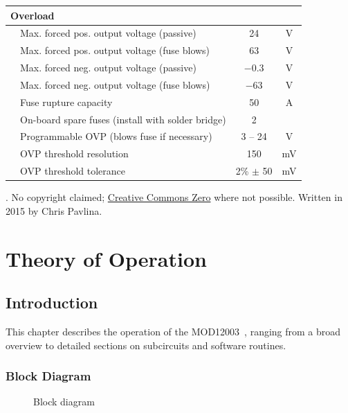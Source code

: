 \documentclass[a4paper,twocolumn,10pt,openany,oneside,final,fleqn]{memoir}
\newcommand{\Neg}[1]{{\ensuremath{-}#1}}
\newcommand{\Model}{MOD12003\ }
\newcommand{\xcircuit}[1]{ \centering \textsf{  } }
\begin{document}
\begin{titlingpage}
\begin{table}[h]
\begin{tabular}{p{2mm}lcc}
    \midrule
    \multicolumn{2}{l}{\textbf{Overload}} & & \\ \midrule
    & Max. forced pos. output voltage (passive) & 24 & V \\
    & Max. forced pos. output voltage (fuse blows) & 63 & V \\
    & Max. forced neg. output voltage (passive) & \Neg{0.3} & V \\
    & Max. forced neg. output voltage (fuse blows) & \Neg{63} & V \\
    & Fuse rupture capacity & 50 & A \\
    & On-board spare fuses (install with solder bridge) & 2 & \\
    & Programmable OVP (blows fuse if necessary) & 3 -- 24 & V \\
    & OVP threshold resolution & 150 & mV \\
    & OVP threshold tolerance  & 2\% $\pm$ 50 & mV \\
    \bottomrule
\end{tabular}
\end{table}
\vfill
\begin{center}
    \ccZero. No copyright claimed;
    \href{https://creativecommons.org/publicdomain/zero/1.0/}{Creative Commons Zero} where not possible.
    Written in 2015 by Chris Pavlina.
\end{center}
\end{titlingpage}

\clearpage
\twocolumn[
    \tableofcontents
]
\twocolumn[
    \listoffigures*
    \listoftables*
]

\mainmatter

\chapter{Theory of Operation}

\section{Introduction}

This chapter describes the operation of the \Model, ranging from a broad overview
to detailed sections on subcircuits and software routines.

\subsection{Block Diagram}

\begin{figure}
\xcircuit{BlockDiagram}
\caption{Block diagram}\label{fig:blockdiagram}
\end{figure}
\end{document}
